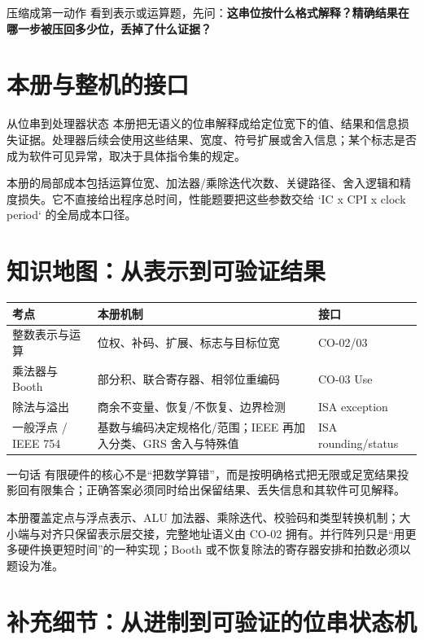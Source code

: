 \documentclass[UTF8,fontset=fandol,11pt,a4paper]{ctexart}
\newcommand{\kw}[1]{\textbf{\color{deep}#1}}
\begin{document}
\begin{methodbox}{压缩成第一动作}
看到表示或运算题，先问：\kw{这串位按什么格式解释？精确结果在哪一步被压回多少位，丢掉了什么证据？}
\end{methodbox}

\section{本册与整机的接口}
\begin{corebox}{从位串到处理器状态}
本册把无语义的位串解释成给定位宽下的值、结果和信息损失证据。处理器后续会使用这些结果、宽度、符号扩展或舍入信息；某个标志是否成为软件可见异常，取决于具体指令集的规定。
\end{corebox}
本册的局部成本包括运算位宽、加法器/乘除迭代次数、关键路径、舍入逻辑和精度损失。它不直接给出程序总时间，性能题要把这些参数交给 `IC x CPI x clock period` 的全局成本口径。

\section{知识地图：从表示到可验证结果}
\begin{center}\small
\begin{tabularx}{\linewidth}{L{3.0cm}YY}\toprule
考点 & 本册机制 & 接口\\\midrule
整数表示与运算 & 位权、补码、扩展、标志与目标位宽 & CO-02/03\\
乘法器与 Booth & 部分积、联合寄存器、相邻位重编码 & CO-03 Use\\
除法与溢出 & 商余不变量、恢复/不恢复、边界检测 & ISA exception\\
一般浮点 / IEEE 754 & 基数与编码决定规格化/范围；IEEE 再加入分类、GRS 舍入与特殊值 & ISA rounding/status\\
\bottomrule
\end{tabularx}
\end{center}

\begin{corebox}{一句话}
有限硬件的核心不是“把数学算错”，而是按明确格式把无限或足宽结果投影回有限集合；正确答案必须同时给出保留结果、丢失信息和其软件可见解释。
\end{corebox}

本册覆盖定点与浮点表示、ALU 加法器、乘除迭代、校验码和类型转换机制；大小端与对齐只保留表示层交接，完整地址语义由 CO-02 拥有。并行阵列只是“用更多硬件换更短时间”的一种实现；Booth 或不恢复除法的寄存器安排和拍数必须以题设为准。

\section{补充细节：从进制到可验证的位串状态机}
\end{document}
